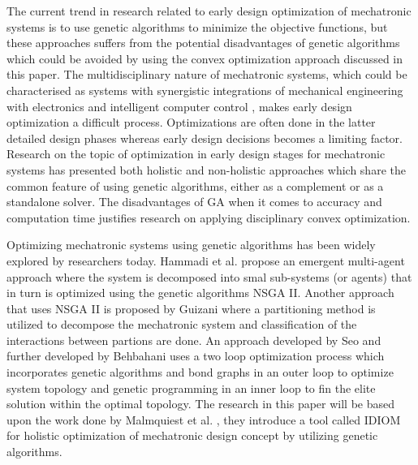 
The current trend in research related to early design optimization of mechatronic systems is to use genetic algorithms to minimize the objective functions, but these approaches suffers from the potential disadvantages of genetic algorithms which could be avoided by using the convex optimization approach discussed in this paper. The multidisciplinary nature of mechatronic systems, which could be characterised as systems with synergistic integrations of mechanical engineering with electronics and intelligent computer control \cite{MechatronicsWWHHarashima}, makes early design optimization a difficult process. Optimizations are often done in the latter detailed design phases \cite{EngineeringDesign} whereas early design decisions becomes a limiting factor. Research on the topic of optimization in early design stages for mechatronic systems has presented both holistic and non-holistic approaches which share the common feature of using genetic algorithms, either as a complement or as a standalone solver. The disadvantages of GA when it comes to accuracy and computation time justifies research on applying disciplinary convex optimization.


\par
Optimizing mechatronic systems using genetic algorithms has been widely explored by researchers today. Hammadi et al. \cite{Hammadi2012, Hammadi2014} propose an emergent multi-agent approach where the system is decomposed into smal sub-systems (or agents) that in turn is optimized using the genetic algorithms NSGA II. Another approach that uses NSGA II is proposed by Guizani \cite{Guizani2014} where a partitioning method is utilized to decompose the mechatronic system and classification of the interactions between partions are done. An approach developed by Seo \cite{Seo2003} and further developed by Behbahani \cite{Behbahani2013, Behbahani2014} uses a two loop optimization process which incorporates genetic algorithms and bond graphs in an outer loop to optimize system topology and genetic programming in an inner loop to fin the elite solution within the optimal topology. The research in this paper will be based upon the work done by Malmquiest et al. \cite{malmquist2015tool}, they introduce a tool called IDIOM for holistic optimization of mechatronic design concept by utilizing genetic algorithms.

